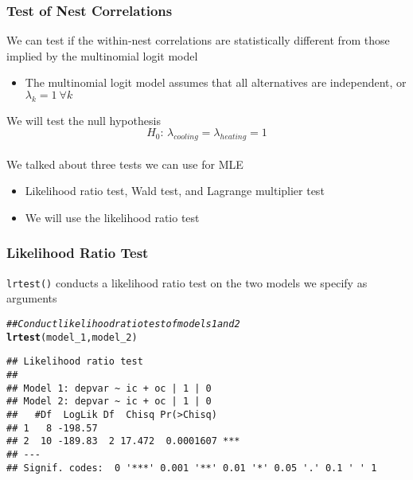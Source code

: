\documentclass{beamer}\usepackage[]{graphicx}\usepackage[]{xcolor}
\makeatletter
\newcommand{\hlcom}[1]{\textcolor[rgb]{0.678,0.584,0.686}{\textit{#1}}}%
\newcommand{\hlstd}[1]{\textcolor[rgb]{0.345,0.345,0.345}{#1}}%
\newcommand{\hlkwd}[1]{\textcolor[rgb]{0.737,0.353,0.396}{\textbf{#1}}}%
\newenvironment{kframe}{%
 \def\at@end@of@kframe{}%
 \ifinner\ifhmode%
  \def\at@end@of@kframe{\end{minipage}}%
  \begin{minipage}{\columnwidth}%
 \fi\fi%
 \def\FrameCommand##1{\hskip\@totalleftmargin \hskip-\fboxsep
 \colorbox{shadecolor}{##1}\hskip-\fboxsep
     \hskip-\linewidth \hskip-\@totalleftmargin \hskip\columnwidth}%
 \MakeFramed {\advance\hsize-\width
   \@totalleftmargin\z@ \linewidth\hsize
   \@setminipage}}%
 {\par\unskip\endMakeFramed%
 \at@end@of@kframe}
\newenvironment{knitrout}{}{} %
\makeatother
\begin{document}
\begin{frame}\frametitle{Test of Nest Correlations}
    We can test if the within-nest correlations are statistically different from those implied by the multinomial logit model
    \begin{itemize}
    	\item The multinomial logit model assumes that all alternatives are independent, or $\lambda_k = 1 ~\forall k$
    \end{itemize}
    \vspace{3ex}
    We will test the null hypothesis
    $$H_0 \text{: } \lambda_{cooling} = \lambda_{heating} = 1$$ \\
    \vspace{3ex}
    We talked about three tests we can use for MLE
    \begin{itemize}
    	\item Likelihood ratio test, Wald test, and Lagrange multiplier test
    	\item We will use the likelihood ratio test
    \end{itemize}
\end{frame}

\begin{frame}[fragile]\frametitle{Likelihood Ratio Test}
    \texttt{lrtest()} conducts a likelihood ratio test on the two models we specify as arguments \\
\begin{knitrout}\footnotesize
{}\color{fgcolor}\begin{kframe}
\begin{alltt}
\hlcom{## Conduct likelihood ratio test of models 1 and 2}
\hlkwd{lrtest}\hlstd{(model_1, model_2)}
\end{alltt}
\begin{verbatim}
## Likelihood ratio test
## 
## Model 1: depvar ~ ic + oc | 1 | 0
## Model 2: depvar ~ ic + oc | 1 | 0
##   #Df  LogLik Df  Chisq Pr(>Chisq)    
## 1   8 -198.57                         
## 2  10 -189.83  2 17.472  0.0001607 ***
## ---
## Signif. codes:  0 '***' 0.001 '**' 0.01 '*' 0.05 '.' 0.1 ' ' 1
\end{verbatim}
\end{kframe}
\end{knitrout}
\end{frame}
\end{document}
